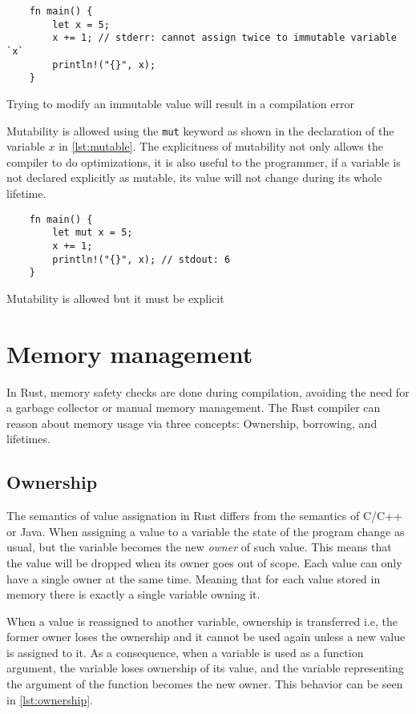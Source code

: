 \begin{listing}[ht]
	\begin{verbatim}
    fn main() {
        let x = 5;
        x += 1; // stderr: cannot assign twice to immutable variable `x`
        println!("{}", x);
    }
	\end{verbatim}
  \caption{Trying to modify an immutable value will result in a compilation error}
  \label{lst:immutable}
\end{listing}

Mutability is allowed using the \texttt{mut} keyword as shown in the declaration of the variable $x$ in \ref{lst:mutable}. The explicitness of mutability not only allows the compiler to do optimizations, it is also useful to the programmer, if a variable is not declared explicitly as mutable, its value will not change during its whole lifetime.

\begin{listing}[ht]
	\begin{verbatim}
    fn main() {
        let mut x = 5;
        x += 1;
        println!("{}", x); // stdout: 6 
    }
	\end{verbatim}
  \caption{Mutability is allowed but it must be explicit}
  \label{lst:mutable}
\end{listing}

\section{Memory management}
In Rust, memory safety checks are done during compilation, avoiding the need for a garbage collector or manual memory management. The Rust compiler can reason about memory usage via three concepts: Ownership, borrowing, and lifetimes.

\subsection{Ownership}
The semantics of value assignation in Rust differs from the semantics of C/C++ or Java. When assigning a value to a variable the state of the program change as usual, but the variable becomes the new \textit{owner} of such value. \cite{ownership_types} This means that the value will be dropped when its owner goes out of scope. Each value can only have a single owner at the same time. Meaning that for each value stored in memory there is exactly a single variable owning it. 

When a value is reassigned to another variable, ownership is transferred i.e, the former owner loses the ownership and it cannot be used again unless a new value is assigned to it. As a consequence, when a variable is used as a function argument, the variable loses ownership of its value, and the variable representing the argument of the function becomes the new owner. This behavior can be seen in \ref{lst:ownership}.


